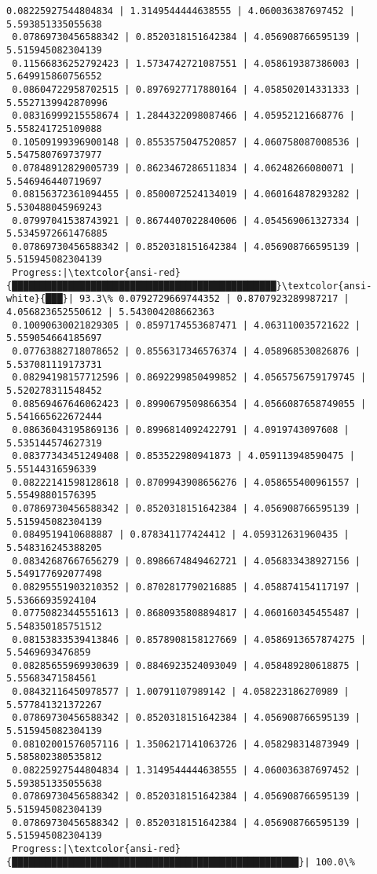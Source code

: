 \documentclass[11pt]{article}
\begin{document}
\begin{Verbatim}[commandchars=\\\{\}]
 0.08225927544804834 | 1.3149544444638555 | 4.060036387697452 | 5.593851335055638
 0.07869730456588342 | 0.8520318151642384 | 4.056908766595139 | 5.515945082304139
 0.11566836252792423 | 1.5734742721087551 | 4.058619387386003 | 5.649915860756552
 0.08604722958702515 | 0.8976927717880164 | 4.058502014331333 | 5.5527139942870996
 0.08316999215558674 | 1.2844322098087466 | 4.05952121668776 | 5.558241725109088
 0.10509199396900148 | 0.8553575047520857 | 4.060758087008536 | 5.547580769737977
 0.07848912829005739 | 0.8623467286511834 | 4.06248266080071 | 5.546946440719697
 0.08156372361094455 | 0.8500072524134019 | 4.060164878293282 | 5.530488045969243
 0.07997041538743921 | 0.8674407022840606 | 4.054569061327334 | 5.5345972661476885
 0.07869730456588342 | 0.8520318151642384 | 4.056908766595139 | 5.515945082304139
 Progress:|\textcolor{ansi-red}{███████████████████████████████████████████████}\textcolor{ansi-white}{███}| 93.3\% 0.0792729669744352 | 0.8707923289987217 | 4.056823652550612 | 5.543004208662363
 0.10090630021829305 | 0.8597174553687471 | 4.063110035721622 | 5.559054664185697
 0.07763882718078652 | 0.8556317346576374 | 4.058968530826876 | 5.537081119173731
 0.08294198157712596 | 0.8692299850499852 | 4.0565756759179745 | 5.520278311548452
 0.08569467646062423 | 0.8990679509866354 | 4.0566087658749055 | 5.541665622672444
 0.08636043195869136 | 0.8996814092422791 | 4.0919743097608 | 5.535144574627319
 0.08377343451249408 | 0.853522980941873 | 4.059113948590475 | 5.55144316596339
 0.08222141598128618 | 0.8709943908656276 | 4.058655400961557 | 5.55498801576395
 0.07869730456588342 | 0.8520318151642384 | 4.056908766595139 | 5.515945082304139
 0.0849519410688887 | 0.878341177424412 | 4.059312631960435 | 5.548316245388205
 0.08342687667656279 | 0.8986674849462721 | 4.056833438927156 | 5.549177692077498
 0.08295551903210352 | 0.8702817790216885 | 4.058874154117197 | 5.53666935924104
 0.07750823445551613 | 0.8680935808894817 | 4.060160345455487 | 5.548350185751512
 0.08153833539413846 | 0.8578908158127669 | 4.0586913657874275 | 5.5469693476859
 0.08285655969930639 | 0.8846923524093049 | 4.058489280618875 | 5.55683471584561
 0.08432116450978577 | 1.00791107989142 | 4.058223186270989 | 5.577841321372267
 0.07869730456588342 | 0.8520318151642384 | 4.056908766595139 | 5.515945082304139
 0.08102001576057116 | 1.3506217141063726 | 4.058298314873949 | 5.585802380535812
 0.08225927544804834 | 1.3149544444638555 | 4.060036387697452 | 5.593851335055638
 0.07869730456588342 | 0.8520318151642384 | 4.056908766595139 | 5.515945082304139
 0.07869730456588342 | 0.8520318151642384 | 4.056908766595139 | 5.515945082304139
 Progress:|\textcolor{ansi-red}{███████████████████████████████████████████████████}| 100.0\%
    \end{Verbatim}
\end{document}
